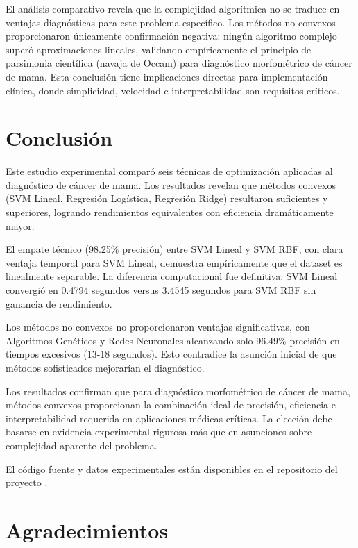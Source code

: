 \documentclass[conference]{IEEEtran}
\begin{document}
El análisis comparativo revela que la complejidad algorítmica no se traduce en ventajas diagnósticas para este problema específico. Los métodos no convexos proporcionaron únicamente confirmación negativa: ningún algoritmo complejo superó aproximaciones lineales, validando empíricamente el principio de parsimonia científica (navaja de Occam) para diagnóstico morfométrico de cáncer de mama. Esta conclusión tiene implicaciones directas para implementación clínica, donde simplicidad, velocidad e interpretabilidad son requisitos críticos.

\section{Conclusión}

Este estudio experimental comparó seis técnicas de optimización aplicadas al diagnóstico de cáncer de mama. Los resultados revelan que métodos convexos (SVM Lineal, Regresión Logística, Regresión Ridge) resultaron suficientes y superiores, logrando rendimientos equivalentes con eficiencia dramáticamente mayor.

El empate técnico (98.25\% precisión) entre SVM Lineal y SVM RBF, con clara ventaja temporal para SVM Lineal, demuestra empíricamente que el dataset es linealmente separable. La diferencia computacional fue definitiva: SVM Lineal convergió en 0.4794 segundos versus 3.4545 segundos para SVM RBF sin ganancia de rendimiento.

Los métodos no convexos no proporcionaron ventajas significativas, con Algoritmos Genéticos y Redes Neuronales alcanzando solo 96.49\% precisión en tiempos excesivos (13-18 segundos). Esto contradice la asunción inicial de que métodos sofisticados mejorarían el diagnóstico.

Los resultados confirman que para diagnóstico morfométrico de cáncer de mama, métodos convexos proporcionan la combinación ideal de precisión, eficiencia e interpretabilidad requerida en aplicaciones médicas críticas. La elección debe basarse en evidencia experimental rigurosa más que en asunciones sobre complejidad aparente del problema.

El código fuente y datos experimentales están disponibles en el repositorio del proyecto \cite{repositorio2024}.

\section*{Agradecimientos}
\end{document}
